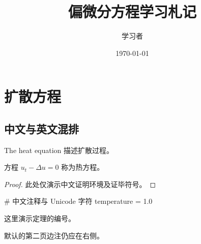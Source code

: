\documentclass[language=chinese,theme=indigo]{lumenbook}
\title{偏微分方程学习札记}
\author{学习者}
\date{\today}
\begin{document}
\chapter{扩散方程}
\section{中文与英文混排}
The heat equation 描述扩散过程。
\begin{definition}[热方程]\label{def:heat}
方程 $u_t-\Delta u=0$ 称为热方程。
\end{definition}
\begin{proof}
此处仅演示中文证明环境及证毕符号。\qedhere
\end{proof}
\begin{marginfigure}
\fbox{\rule{0pt}{12mm}\rule{28mm}{0pt}}
\caption{中文图题}
\end{marginfigure}
\begin{codeblock}[language=Python,title={中文代码示例}]
# 中文注释与 Unicode 字符
temperature = 1.0
\end{codeblock}
\newpage
\begin{theorem}[第二页]
这里演示定理的编号。
\end{theorem}
默认的第二页边注仍应在右侧。
\end{document}
